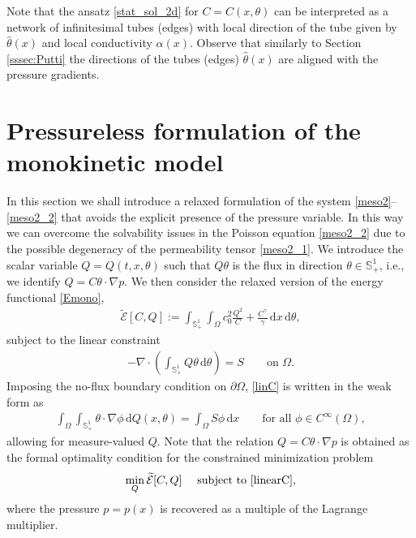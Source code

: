\documentclass{article}
\numberwithin{equation}{section}
\def\d{\,\mathrm{d}}
\begin{document}
Note that the ansatz \eqref{stat_sol_2d} for $C=C(x,\theta)$ can be interpreted
as a network of infinitesimal tubes (edges) with local direction of the tube given by $\hat{\theta}(x)$
and local conductivity $\alpha(x)$.
Observe that similarly to Section \ref{sssec:Putti} the directions of the tubes (edges) $\hat{\theta}(x)$
are aligned with the pressure gradients.


\section{Pressureless formulation of the monokinetic model}\label{sec:pressureless}
In this section we shall introduce a relaxed formulation of the system \eqref{meso2}--\eqref{meso2_2} that avoids the explicit presence of the pressure variable.
In this way we can overcome the solvability issues in the Poisson equation \eqref{meso2_2} due to the possible degeneracy of the permeability tensor \eqref{meso2_1}.
We introduce the scalar variable $Q=Q(t,x,\theta)$ such that $Q\theta$ is the flux in direction $\theta\in\mathbb{S}^1_+$, i.e., 
we identify $Q=C \theta \cdot \nabla p$.
We then consider the relaxed version of the energy functional \eqref{Emono},
\begin{align}\label{energy_pless}
   \widetilde{\mathcal{E}}[C,Q] := \int_{\mathbb{S}_+^1} \int_\Omega c_0^2 \frac{Q^2}{C}+\frac{C^\gamma}{\gamma} \d x \d\theta,
\end{align}
subject to the linear constraint
\begin{align}\label{linC}
   -\nabla \cdot \left(\int_{\mathbb{S}_+^1} Q \theta \d\theta \right) = S\qquad\mbox{on } \Omega.
\end{align}
Imposing the no-flux boundary condition on $\partial\Omega$, \eqref{linC} is written in the weak form as
\begin{align}\label{linearC}
   \int_\Omega \int_{\mathbb{S}_+^1} \theta\cdot\nabla\phi \d Q(x, \theta) = \int_\Omega S \phi \d x\qquad
   \mbox{for all } \phi\in C^\infty(\Omega),
\end{align}
allowing for measure-valued $Q$.
Note that the relation $Q=C \theta \cdot \nabla p$ is obtained as the formal optimality condition
for the constrained minimization problem
\begin{align} \label{Q[C]}
    \min_{Q} \widetilde{\mathcal{E}}[C,Q]\quad \text{ subject to } \eqref{linearC},
\end{align}
where the pressure $p=p(x)$ is recovered as a multiple of the Lagrange multiplier.
\end{document}
